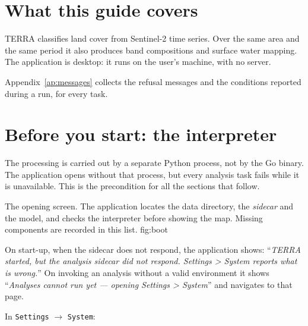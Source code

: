 \documentclass[12pt,a4paper]{article}
\newcommand{\msg}[1]{``\textit{#1}''}
\begin{document}
\section{What this guide covers}

TERRA classifies land cover from Sentinel-2 time series. Over the same area and
the same period it also produces band compositions and surface water mapping.
The application is desktop: it runs on the user's machine, with no server.

Appendix~\ref{ap:messages} collects the refusal messages and the conditions
reported during a run, for every task.

\section{Before you start: the interpreter}

The processing is carried out by a separate Python process, not by the Go
binary. The application opens without that process, but every analysis task
fails while it is unavailable. This is the precondition for all the sections
that follow.

  {The opening screen. The application locates the data directory, the
   \emph{sidecar} and the model, and checks the interpreter before showing the
   map. Missing components are recorded in this list.}
  {fig:boot}

 On start-up, when the sidecar does not
respond, the application shows: \msg{TERRA started, but the analysis sidecar
did not respond. Settings > System reports what is wrong.} On invoking an
analysis without a valid environment it shows \msg{Analyses cannot run yet ---
opening Settings > System} and navigates to that page.

 In \texttt{Settings} $\rightarrow$ \texttt{System}:
\end{document}

